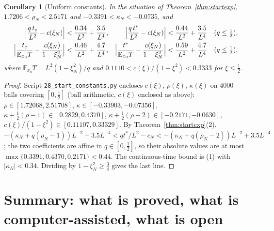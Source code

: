\documentclass[11pt,a4paper]{article}
\newtheorem{corollary}[theorem]{Corollary}
\theoremstyle{definition}
\theoremstyle{remark}
\newcommand{\E}{\mathbb{E}}
\begin{document}
\begin{corollary}[Uniform constants]\label{cor:startuniform}
In the situation of Theorem~\ref{thm:startexp}, $1.7206<\rho_N<2.5171$ and $-0.3391<\kappa_N<-0.0735$, and
\begin{align*}
  \Bigl|\frac{q\,t_{\rm c}}{L^2}-c(\xi_N)\Bigr|&<\frac{0.34}{L^2}+\frac{3.5}{L^4}, &
  \Bigl|\frac{q\,t^*}{L^2}-c(\xi_N)\Bigr|&<\frac{0.44}{L^2}+\frac{3.5}{L^4}\quad(q\le\tfrac12),\\
  \Bigl|\frac{t_{\rm c}}{\E_{x_0}T}-\frac{c(\xi_N)}{1-\xi_N^2}\Bigr|&<\frac{0.46}{L^2}+\frac{4.7}{L^4}, &
  \Bigl|\frac{t^*}{\E_{x_0}T}-\frac{c(\xi_N)}{1-\xi_N^2}\Bigr|&<\frac{0.59}{L^2}+\frac{4.7}{L^4}\quad(q\le\tfrac12),
\end{align*}
where $\E_{x_0}T=L^2(1-\xi_N^2)/q$ and $0.1110<c(\xi)/(1-\xi^2)<0.3333$ for $\xi\le\frac12$.
\end{corollary}
\begin{proof}
Script \texttt{28\_start\_constants.py} encloses $c(\xi)$, $\rho(\xi)$, $\kappa(\xi)$ on $4000$ balls covering
$[0,\frac12]$ (ball arithmetic, $c(\xi)$ enclosed as above): $\rho\in[1.72068,2.51708]$, $\kappa\in[-0.33903,-0.07356]$,
$\kappa+\frac12(\rho-1)\in[0.2829,0.4370]$, $\kappa+\frac12(\rho-2)\in[-0.2171,-0.0630]$,
$c(\xi)/(1-\xi^2)\in[0.11107,0.33329]$. By Theorem~\ref{thm:startexp}(2),
$-(\kappa_N+q(\rho_N-1))L^{-2}-3.5L^{-4}<qt^*/L^2-c_N<-(\kappa_N+q(\rho_N-2))L^{-2}+3.5L^{-4}$; the two coefficients are
affine in $q\in[0,\frac12]$, so their absolute values are at most $\max\{0.3391,0.4370,0.2171\}<0.44$. The continuous-time
bound is (1) with $|\kappa_N|<0.34$. Dividing by $1-\xi_N^2\ge\frac34$ gives the last line.
\end{proof}

\section{Summary: what is proved, what is computer-assisted, what is open}\label{sec:gaps}
\end{document}
